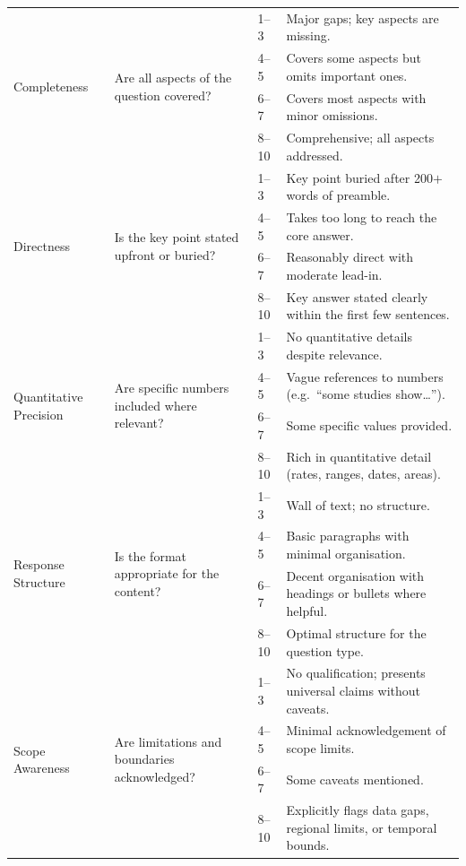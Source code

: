 \begin{longtable}{@{}p{2.6cm} p{4.0cm} p{1.2cm} p{6.0cm}@{}}
\multirow{4}{2.6cm}{Completeness}
& \multirow{4}{4.0cm}{Are all aspects of the question covered?}
& 1--3 & Major gaps; key aspects are missing. \\
& & 4--5 & Covers some aspects but omits important ones. \\
& & 6--7 & Covers most aspects with minor omissions. \\
& & 8--10 & Comprehensive; all aspects addressed. \\
\midrule

\multirow{4}{2.6cm}{Directness}
& \multirow{4}{4.0cm}{Is the key point stated upfront or buried?}
& 1--3 & Key point buried after 200$+$ words of preamble. \\
& & 4--5 & Takes too long to reach the core answer. \\
& & 6--7 & Reasonably direct with moderate lead-in. \\
& & 8--10 & Key answer stated clearly within the first few sentences. \\
\midrule

\multirow{4}{2.6cm}{Quantitative Precision}
& \multirow{4}{4.0cm}{Are specific numbers included where relevant?}
& 1--3 & No quantitative details despite relevance. \\
& & 4--5 & Vague references to numbers (e.g.\ ``some studies show\ldots''). \\
& & 6--7 & Some specific values provided. \\
& & 8--10 & Rich in quantitative detail (rates, ranges, dates, areas). \\
\midrule

\multirow{4}{2.6cm}{Response Structure}
& \multirow{4}{4.0cm}{Is the format appropriate for the content?}
& 1--3 & Wall of text; no structure. \\
& & 4--5 & Basic paragraphs with minimal organisation. \\
& & 6--7 & Decent organisation with headings or bullets where helpful. \\
& & 8--10 & Optimal structure for the question type. \\
\midrule

\multirow{4}{2.6cm}{Scope Awareness}
& \multirow{4}{4.0cm}{Are limitations and boundaries acknowledged?}
& 1--3 & No qualification; presents universal claims without caveats. \\
& & 4--5 & Minimal acknowledgement of scope limits. \\
& & 6--7 & Some caveats mentioned. \\
& & 8--10 & Explicitly flags data gaps, regional limits, or temporal bounds. \\
\midrule


\end{longtable}
